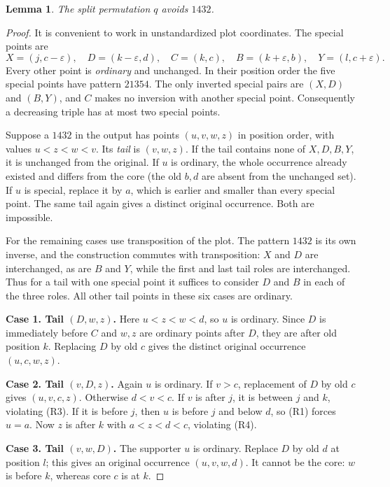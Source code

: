 \documentclass[11pt]{article}
\newtheorem{lemma}[theorem]{Lemma}
\theoremstyle{remark}\newtheorem{remark}[theorem]{Remark}
\begin{document}
\begin{lemma}\label{u1432:lem:splitavoid}
The split permutation $q$ avoids $1432$.
\end{lemma}
\begin{proof}
It is convenient to work in unstandardized plot coordinates. The special
points are
\[
 X=(j,c-\varepsilon),\quad D=(k-\varepsilon,d),\quad
 C=(k,c),\quad B=(k+\varepsilon,b),\quad Y=(l,c+\varepsilon).
\]
Every other point is \emph{ordinary} and unchanged. In their position
order the five special points have pattern $21354$. The only inverted
special pairs are $(X,D)$ and $(B,Y)$, and $C$ makes no inversion with
another special point. Consequently a decreasing triple has at most two
special points.

Suppose a $1432$ in the output has points $(u,v,w,z)$ in position order,
with values $u<z<w<v$. Its \emph{tail} is $(v,w,z)$. If the tail contains
none of $X,D,B,Y$, it is unchanged from the original. If $u$ is ordinary,
the whole occurrence already existed and differs from the core (the old
$b,d$ are absent from the unchanged set). If $u$ is special, replace it
by $a$, which is earlier and smaller than every special point. The same
tail again gives a distinct original occurrence. Both are impossible.

For the remaining cases use transposition of the plot. The pattern
$1432$ is its own inverse, and the construction commutes with transposition:
$X$ and $D$ are interchanged, as are $B$ and $Y$, while the first and last
tail roles are interchanged. Thus for a tail with one special point it
suffices to consider $D$ and $B$ in each of the three roles. All other
tail points in these six cases are ordinary.

\medskip\noindent\textbf{Case 1. Tail $(D,w,z)$.}
Here $u<z<w<d$, so $u$ is ordinary. Since $D$ is immediately before $C$
and $w,z$ are ordinary points after $D$, they are after old position $k$.
Replacing $D$ by old $c$ gives the distinct original occurrence
$(u,c,w,z)$.

\medskip\noindent\textbf{Case 2. Tail $(v,D,z)$.}
Again $u$ is ordinary. If $v>c$, replacement of $D$ by old $c$ gives
$(u,v,c,z)$. Otherwise $d<v<c$. If $v$ is after $j$, it is between $j$
and $k$, violating (R3). If it is before $j$, then $u$ is before $j$
and below $d$, so (R1) forces $u=a$. Now $z$ is after $k$ with
$a<z<d<c$, violating (R4).

\medskip\noindent\textbf{Case 3. Tail $(v,w,D)$.}
The supporter $u$ is ordinary. Replace $D$ by old $d$ at position $l$;
this gives an original occurrence $(u,v,w,d)$. It cannot be the core:
$w$ is before $k$, whereas core $c$ is at $k$.


\end{proof}
\end{document}
